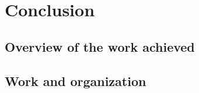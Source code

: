 \chapter{Conclusion}

\section*{Overview of the work achieved}

%
%
%
%
%
%

\section*{Work and organization}

